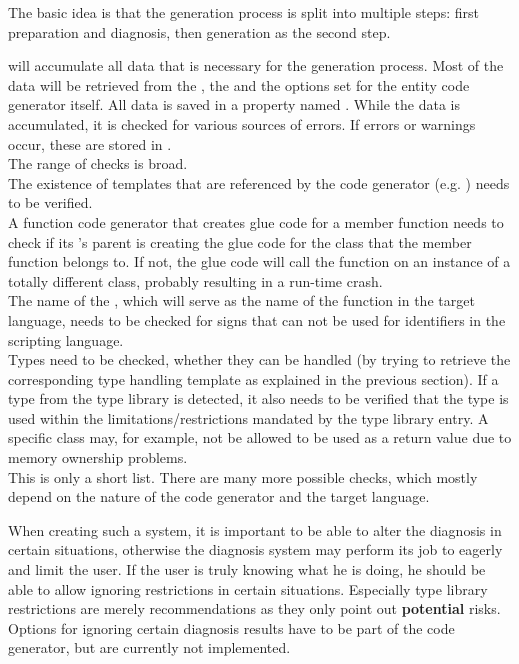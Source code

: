 The basic idea is that the generation process is split into multiple steps: first preparation and diagnosis, then generation as the second step.

 will accumulate all data that is necessary for the generation process. Most of the data will be retrieved from the , the  and the options set for the entity code generator itself. All data is saved in a property named . While the data is accumulated, it is checked for various sources of errors. If errors or warnings occur, these are stored in .\\
The range of checks is broad.\\
The existence of templates that are referenced by the code generator \linebreak(e.g. ) needs to be verified.\\
A function code generator that creates glue code for a member function needs to check if its 's parent is creating the glue code for the class that the member function belongs to. If not, the glue code will call the function on an instance of a totally different class, probably resulting in a run-time crash.\\
The name of the , which will serve as the name of the function in the target language, needs to be checked for signs that can not be used for identifiers in the scripting language.\\
Types need to be checked, whether they can be handled (by trying to retrieve the corresponding type handling template as explained in the previous section). If a type from the type library is detected, it also needs to be verified that the type is used within the limitations/restrictions mandated by the type library entry. A specific class may, for example, not be allowed to be used as a return value due to memory ownership problems.\\
This is only a short list. There are many more possible checks, which mostly depend on the nature of the code generator and the target language. 

When creating such a system, it is important to be able to alter the diagnosis in certain situations, otherwise the diagnosis system may perform its job to eagerly and limit the user. If the user is truly knowing what he is doing, he should be able to allow ignoring restrictions in certain situations. Especially type library restrictions are merely recommendations as they only point out \textbf{potential} risks. Options for ignoring certain diagnosis results have to be part of the code generator, but are currently not implemented.

